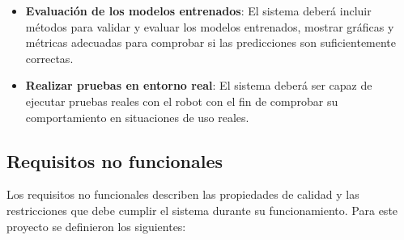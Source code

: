 \begin{itemize}
    \item \textbf{Evaluación de los modelos entrenados}:
    El sistema deberá incluir métodos para validar y evaluar los modelos entrenados, mostrar gráficas y métricas adecuadas para comprobar si las predicciones 
    son suficientemente correctas.

    \item \textbf{Realizar pruebas en entorno real}:
    El sistema deberá ser capaz de ejecutar pruebas reales con el robot con el fin de comprobar su comportamiento en situaciones de uso reales.
    
\end{itemize}


\subsection{Requisitos no funcionales}
\label{sec:req_no_funcionales}

Los requisitos no funcionales describen las propiedades de calidad y las restricciones que debe cumplir el sistema durante su funcionamiento.
Para este proyecto se definieron los siguientes:

